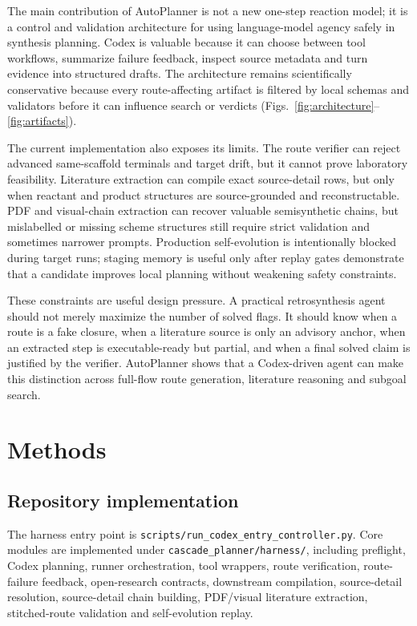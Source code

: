 \documentclass[11pt]{article}
\begin{document}
The main contribution of AutoPlanner is not a new one-step reaction model; it is a control and validation architecture for using language-model agency safely in synthesis planning. Codex is valuable because it can choose between tool workflows, summarize failure feedback, inspect source metadata and turn evidence into structured drafts. The architecture remains scientifically conservative because every route-affecting artifact is filtered by local schemas and validators before it can influence search or verdicts (Figs.~\ref{fig:architecture}--\ref{fig:artifacts}).

The current implementation also exposes its limits. The route verifier can reject advanced same-scaffold terminals and target drift, but it cannot prove laboratory feasibility. Literature extraction can compile exact source-detail rows, but only when reactant and product structures are source-grounded and reconstructable. PDF and visual-chain extraction can recover valuable semisynthetic chains, but mislabelled or missing scheme structures still require strict validation and sometimes narrower prompts. Production self-evolution is intentionally blocked during target runs; staging memory is useful only after replay gates demonstrate that a candidate improves local planning without weakening safety constraints.

These constraints are useful design pressure. A practical retrosynthesis agent should not merely maximize the number of solved flags. It should know when a route is a fake closure, when a literature source is only an advisory anchor, when an extracted step is executable-ready but partial, and when a final solved claim is justified by the verifier. AutoPlanner shows that a Codex-driven agent can make this distinction across full-flow route generation, literature reasoning and subgoal search.

\section*{Methods}

\subsection*{Repository implementation}

The harness entry point is \texttt{scripts/run\_codex\_entry\_controller.py}. Core modules are implemented under \texttt{cascade\_planner/harness/}, including preflight, Codex planning, runner orchestration, tool wrappers, route verification, route-failure feedback, open-research contracts, downstream compilation, source-detail resolution, source-detail chain building, PDF/visual literature extraction, stitched-route validation and self-evolution replay.
\end{document}

